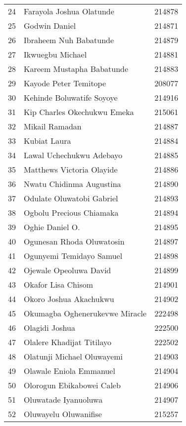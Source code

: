 \documentclass[a4paper]{article}
\begin{document}
\begin{center}
\begin{longtable} { c|l|c }
            24 & Farayola Joshua Olatunde & 214878\\
            25 & Godwin Daniel & 214871\\
            26 & Ibraheem Nuh Babatunde & 214879\\
            27 & Ikwuegbu Michael & 214881\\
            28 & Kareem Mustapha Babatunde & 214883\\
            29 & Kayode Peter Temitope & 208077\\
            30 & Kehinde Boluwatife Soyoye & 214916\\
            31 & Kip Charles Okechukwu Emeka & 215061\\
            32 & Mikail Ramadan  & 214887\\
            33 & Kubiat Laura & 214884\\
            34 & Lawal Uchechukwu Adebayo & 214885\\
            35 & Matthews Victoria Olayide & 214886\\
            36 & Nwatu Chidinma Augustina & 214890\\
            37 & Odulate Oluwatobi Gabriel & 214893\\
            38 & Ogbolu Precious Chiamaka & 214894\\
            39 & Oghie Daniel O. & 214895\\
            40 & Ogunesan Rhoda Oluwatosin & 214897\\
            41 & Ogunyemi Temidayo Samuel & 214898\\
            42 & Ojewale Opeoluwa David & 214899\\
            43 & Okafor Lisa Chisom & 214901\\
            44 & Okoro Joshua Akachukwu & 214902\\
            45 & Okumagba Oghenerukevwe Miracle & 222498\\
            46 & Olagidi Joshua & 222500\\
            47 & Olalere Khadijat Titilayo & 222502\\
            48 & Olatunji Michael Oluwayemi & 214903\\
            49 & Olawale Eniola Emmanuel & 214904\\
            50 & Olorogun Ebikabowei Caleb & 214906\\
            51 & Oluwatade Iyanuoluwa & 214907\\
            52 & Oluwayelu Oluwanifise & 215257\\

\end{longtable}
\end{center}
\end{document}
